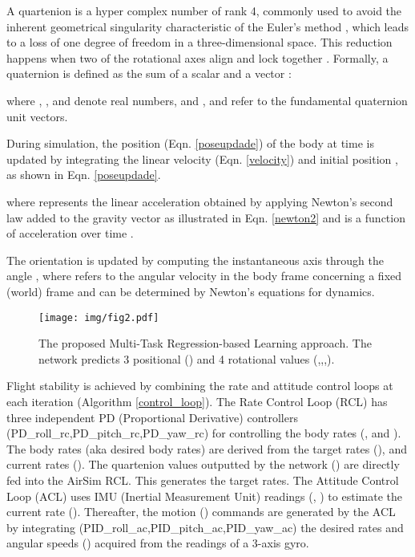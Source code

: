 \documentclass[letterpaper, 10 pt, journal, twoside]{IEEEtran}
\begin{document}
 A quartenion is a hyper complex number of rank 4, commonly used to avoid the inherent geometrical singularity characteristic of the Euler's method \cite{euler1776novi}, which leads to a loss of one degree of freedom in a three-dimensional space. This reduction happens when two of the rotational axes align and lock together \cite{fresk2013full}. Formally, a quaternion  is defined as the sum of a scalar  and a vector :

 where , ,  and  denote real numbers, and ,  and  refer to the fundamental quaternion unit vectors.
  
During simulation, the position  (Eqn. \ref{poseupdade}) of the body at time  is updated by integrating the linear velocity (Eqn. \ref{velocity}) and initial position , as shown in Eqn. \ref{poseupdade}.


where  represents the linear acceleration obtained by applying Newton's second law added to the gravity vector as illustrated in Eqn. \ref{newton2} and  is a function of acceleration over time .


The orientation is updated by computing the instantaneous axis  through the angle , where  refers to the angular velocity in the body frame concerning a fixed (world) frame and can be determined by Newton's equations for dynamics.
 
 \begin{figure*}[!t]
    \centering
    \texttt{[image: img/fig2.pdf]}
    \caption{The proposed Multi-Task Regression-based Learning approach. The network predicts 3 positional () and 4 rotational values (,,,).}
    \label{fig:network}\vspace{-0.4cm}
\end{figure*}


Flight stability is achieved by combining the rate and attitude control loops at each iteration  (Algorithm \ref{control_loop}). The Rate Control Loop (RCL) has three independent PD (Proportional Derivative) controllers (PD\_roll\_rc,PD\_pitch\_rc,PD\_yaw\_rc) for controlling the body rates (,  and ). The body rates (aka desired body rates) are derived from the target rates (), and current rates ().  The quartenion values outputted by the network () are directly fed into the AirSim RCL. This generates the target rates. The Attitude Control Loop (ACL) uses IMU (Inertial Measurement Unit) readings (, ) to estimate the current rate (). Thereafter, the motion () commands are generated by the ACL by integrating (PID\_roll\_ac,PID\_pitch\_ac,PID\_yaw\_ac) the desired rates and angular speeds () acquired from the readings of a 3-axis gyro.
\end{document}
